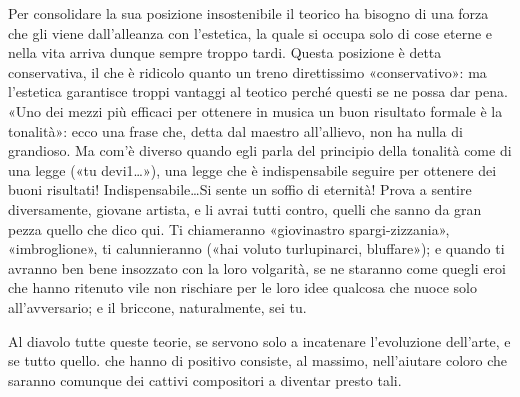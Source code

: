 Per consolidare la sua posizione insostenibile il teorico ha bisogno di una forza che gli viene dall'alleanza con l'estetica, la quale si occupa solo di cose eterne e nella vita arriva dunque sempre troppo tardi. Questa posizione è detta conservativa, il che è ridicolo quanto un treno direttissimo «conservativo»: ma l'estetica garantisce troppi vantaggi al teotico perché questi se ne possa dar pena. «Uno dei mezzi più efficaci per ottenere in musica un buon risultato formale è la tonalità»: ecco una frase che, detta dal maestro all'allievo, non ha nulla di grandioso. Ma com'è diverso quando egli parla del principio della tonalità come di una legge («tu devi1\ldots»), una legge che è indispensabile seguire per ottenere dei buoni risultati! Indispensabile\ldots Si sente un soffio di eternità! Prova a sentire diversamente, giovane artista, e li avrai tutti contro, quelli che sanno da gran pezza quello che dico qui. Ti chiameranno «giovinastro spargi-zizzania», «imbroglione», ti calunnieranno («hai voluto turlupinarci, bluffare»); e quando ti avranno ben bene insozzato con la loro volgarità, se ne staranno come quegli eroi che hanno ritenuto vile non rischiare per le loro idee qualcosa che nuoce solo all'avversario; e il briccone, naturalmente, sei tu.

Al diavolo tutte queste teorie, se servono solo a incatenare l'evoluzione dell'arte, e se tutto quello. che hanno di positivo consiste, al massimo, nell'aiutare coloro che saranno comunque dei cattivi compositori a diventar presto tali.

